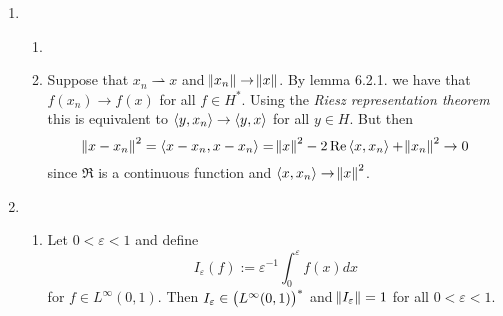 \begin{enumerate}[label = \textbf{Exercise \arabic*.},wide = 0pt, itemsep = 1.5ex]
		\begin{lemma}
			Let $X$ be a normed space and $(x_n)_{n \in \mathbb{N}}$ a sequence in $X$ such that $x_n \rightharpoonup x$. If $x_n \to y$ for some $y \in X$, then $x = y$.
		\end{lemma}

		\begin{proof}
			Suppose that $x_n \to y$. Then since $\mathcal{T}_W \subseteq \mathcal{T}_{\norm[0]{\cdot}}$, we have that $x_n \rightharpoonup y$. But $(X,\mathcal{T}_W)$ is Hausdorff and thus limits are unique. Hence $x = y$.
		\end{proof}

		\begin{corollary}
			Let $1 < p < \infty$. Then $g_n$, $h_n$ and $k_n$ do not converge in norm.
		\end{corollary}

		\begin{proof}
			Since all three sequences converge weakly to $0$, we only have to show that they do not converge towards $0$ in $L^p(\mathbb{R})$. However, this is immediate from the first lemma, since all sequences have constant norm $\norm{f}_p \neq 0$ and hence the limit should have also nonzero norm.
		\end{proof}

		Let us now investigate the case $p = 1$.

	\item
		~
		\begin{enumerate}[label = \textbf{\alph*.},wide = 0pt, itemsep = 1.5ex]
			\item 
			\item Suppose that $x_n \rightharpoonup x$ and $\norm{x_n} \to \norm{x}$. By lemma 6.2.1. we have that $f(x_n) \to f(x)$ for all $f \in H^*$. Using the \emph{Riesz representation theorem} this is equivalent to $\inprod{y}{x_n} \to \inprod{y}{x}$ for all $y \in H$. But then
				\begin{equation*}
					\norm{x - x_n}^2 = \inprod{x - x_n}{x - x_n} = \norm{x}^2 - 2\Re\inprod{x}{x_n} + \norm{x_n}^2 \to 0
				\end{equation*}
				\noindent since $\Re$ is a continuous function and $\inprod{x}{x_n} \to \norm{x}^2$.
		\end{enumerate}

	\item 
		~
		\begin{enumerate}[label = \textbf{\alph*.},wide = 0pt, itemsep = 1.5ex]
			\item 
				\begin{lemma}
					Let $0 < \varepsilon < 1$ and define 
					\begin{equation*}
						I_\varepsilon(f) := \varepsilon^{-1}\int_0^\varepsilon f(x) dx
					\end{equation*}
					\noindent for $f \in L^\infty(0,1)$. Then $I_\varepsilon \in \del[1]{L^\infty(0,1)}^*$ and $\norm{I_\varepsilon} = 1$ for all $0 < \varepsilon < 1$.
				\end{lemma}


\end{enumerate}
\end{enumerate}
